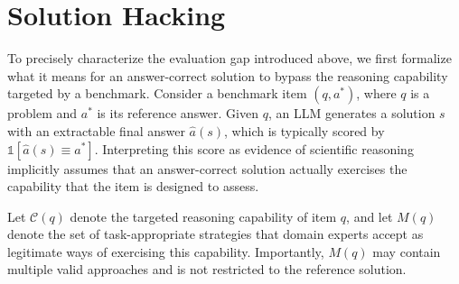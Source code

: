 
\section{Solution Hacking}
\label{sec:taxonomy}

To precisely characterize the evaluation gap introduced above, we first
formalize what it means for an answer-correct solution to bypass the reasoning
capability targeted by a benchmark. Consider a benchmark item
$(q,a^{*})$, where $q$ is a problem and $a^{*}$ is its reference answer.
Given $q$, an LLM generates a solution $s$ with an extractable final answer
$\hat a(s)$, which is typically scored by
$\mathbb{1}[\hat a(s)\equiv a^{*}]$. Interpreting this score as evidence of
scientific reasoning implicitly assumes that an answer-correct solution
actually exercises the capability that the item is designed to assess.

Let $\mathcal{C}(q)$ denote the targeted reasoning capability of item $q$,
and let $M(q)$ denote the set of task-appropriate strategies that domain
experts accept as legitimate ways of exercising this capability. Importantly,
$M(q)$ may contain multiple valid approaches and is not restricted to the
reference solution.

